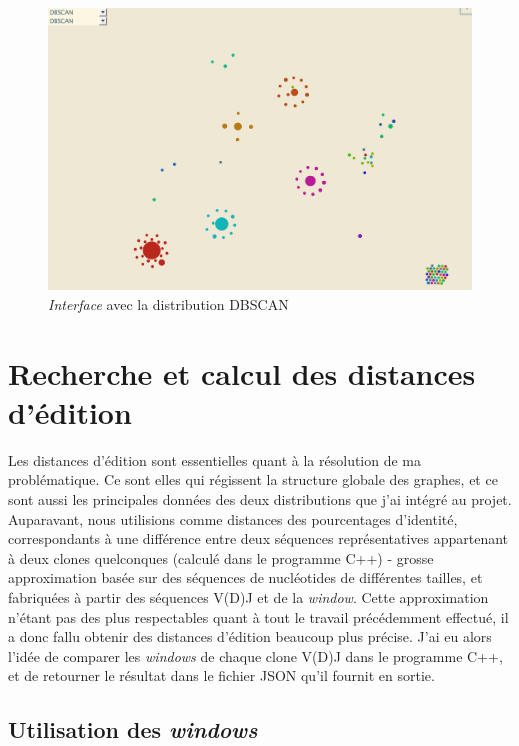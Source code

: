 \documentclass[pdftex,12pt,a4paper]{report}
\begin{document}
\begin{spacing}{1.2}
\begin{figure}[h!]
\begin{center}
	\includegraphics[scale=0.57]{img/DBSCAN-Ex.jpg}
\end{center}
\caption{\textit{Interface} avec la distribution DBSCAN}
\end{figure}

\chapter{Recherche et calcul des distances d'édition}

Les distances d'édition sont essentielles quant à la résolution de ma problématique. Ce sont elles qui régissent la structure globale des graphes, et ce sont aussi les principales données des deux distributions que j'ai intégré au projet.
\newline
Auparavant, nous utilisions comme distances des pourcentages d'identité, correspondants à une différence entre deux séquences représentatives appartenant à deux clones quelconques (calculé dans le programme C++) - grosse approximation basée sur des séquences de nucléotides de différentes tailles, et fabriquées à partir des séquences V(D)J et de la \textit{window}. Cette approximation n'étant pas des plus respectables quant à tout le travail précédemment effectué, il a donc fallu obtenir des distances d'édition beaucoup plus précise. J'ai eu alors l'idée de comparer les \textit{windows} de chaque clone V(D)J dans le programme C++, et de retourner le résultat dans le fichier JSON qu'il fournit en sortie.

\section{Utilisation des \textit{windows}}


\end{spacing}
\end{document}
